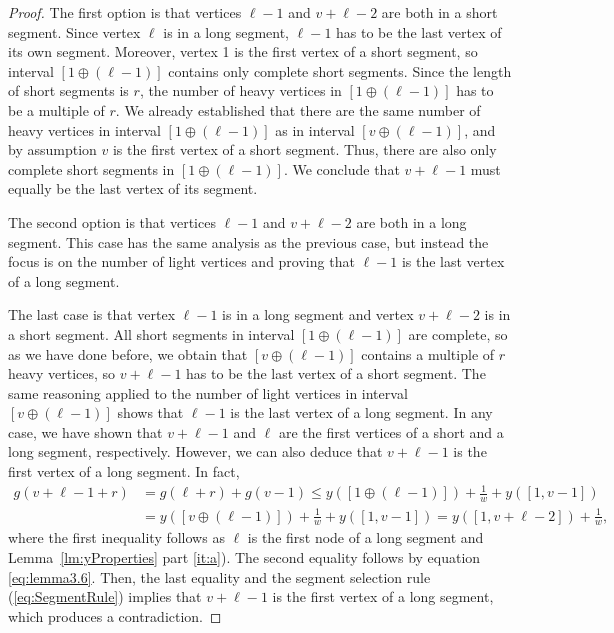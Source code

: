 \documentclass[11pt]{article}
\newcommand\+{\mkern2mu}
\begin{document}
\begin{proof}
    The first option is that vertices $\ell-1$ and $v + \ell - 2$ are both in a short segment. Since vertex $\ell$ is in a long segment, $\ell - 1$ has to be the last vertex of its own segment. Moreover, vertex 1 is the first vertex of a short segment, so interval $[1 \oplus (\ell - 1)]$ contains only complete short segments. Since the length of short segments is $r$, the number of heavy vertices in $[1 \oplus (\ell - 1)]$ has to be a multiple of $r$. We already established that there are the same number of heavy vertices in interval $[1 \oplus (\ell-1)]$ as in interval $[v \oplus (\ell-1)]$, and by assumption $v$ is the first vertex of a short segment. Thus, there are also only complete short segments in $[1 \oplus (\ell-1)]$. We conclude that $v + \ell - 1$ must equally be the last vertex of its segment. 
    
    The second option is that vertices $\ell-1$ and $v + \ell - 2$ are both in a long segment. This case has the same analysis as the previous case, but instead the focus is on the number of light vertices and proving that $\ell-1$ is the last vertex of a long segment. 
    
    The last case is that vertex $\ell-1$ is in a long segment and vertex $v + \ell - 2$ is in a short segment. All short segments in interval $[1 \oplus (\ell - 1)]$ are complete, so as we have done before, we obtain that $[v \oplus (\ell-1)]$ contains a multiple of $r$ heavy vertices, so $v + \ell - 1$ has to be the last vertex of a short segment. The same reasoning applied to the number of light vertices in interval $[v \oplus (\ell-1)]$ shows that $\ell-1$ is the last vertex of a long segment. In any case, we have shown that $v + \ell -1$ and $\ell$ are the first vertices of a short and a long segment, respectively. However, we can also deduce that $v+\ell-1$ is the first vertex of a long segment. In fact,
    \begin{align*}\label{eq:ine1toell}
    g(v+\ell -1 + r) &= g(\ell+r) + g(v-1) \le y([1\oplus (\ell-1)]) + \frac{1}{w} + y([1,v-1]) \\ &= y([v\oplus (\ell-1)]) + \frac{1}{w} + y([1,v-1]) = y([1,v+\ell-2]) + \frac{1}{w},
    \end{align*}
    where the first inequality follows as $\ell$ is the first node of a long segment and Lemma~\ref{lm:yProperties} part \ref{it:a}). The second equality follows by equation \eqref{eq:lemma3.6}. Then, the last equality and the segment selection rule (\ref{eq:SegmentRule}) implies that $v+\ell -1$ is the first vertex of a long segment, which produces a contradiction.


\end{proof}
\end{document}
